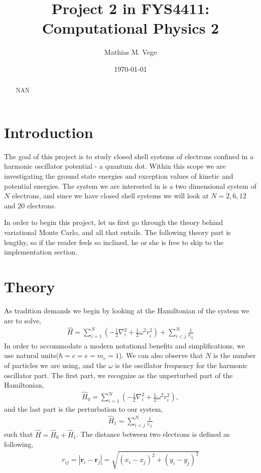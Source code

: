 \documentclass[11pt]{article}
\title{Project 2 in FYS4411: Computational Physics 2}
\author{Mathias M. Vege}
\date{\today}
\begin{document}
\maketitle

\begin{abstract}
NAN
\end{abstract}

\tableofcontents

\section{Introduction}
The goal of this project is to study closed shell systems of electrons confined in a harmonic oscillator potential - a quantum dot. Within this scope we are investigating the ground state energies and exception values of kinetic and potential energies. The system we are interested in is a two dimensional system of $N$ electrons, and since we have closed shell systems we will look at $N=2,6,12$ and $20$ electrons.

In order to begin this project, let us first go through the theory behind variational Monte Carlo, and all that entails. The following theory part is lengthy, so if the reader feels so inclined, he or she is free to skip to the implementation section.

\section{Theory}
As tradition demands we begin by looking at the Hamiltonian of the system we are to solve,
\begin{align}
	\hat{H} = \sum^N_{i=1} \left( -\frac{1}{2}\nabla^2_i + \frac{1}{2}\omega^2r^2_i \right) + \sum^N_{i<j} \frac{1}{r_{ij}}
	\label{eq:hamiltonian}
\end{align}
In order to accommodate a modern notational benefits and simplifications, we use natural units($\hbar = c = e = m_e = 1$). We can also observe that $N$ is the number of particles we are using, and the $\omega$ is the oscillator frequency for the harmonic oscillator part. The first part, we recognize as the unperturbed part of the Hamiltonian,
\begin{align}
	\hat{H}_0 = \sum^N_{i=1} \left( -\frac{1}{2}\nabla^2_i + \frac{1}{2}\omega^2r^2_i \right),
	\label{eq:hamiltonian_unperturbed}
\end{align}
and the last part is the perturbation to our system,
\begin{align}
	\hat{H}_1 = \sum^N_{i<j} \frac{1}{r_{ij}}
	\label{eq:hamiltonian_perturbed}
\end{align}
such that $\hat{H} = \hat{H}_0 + \hat{H}_1$. The distance between two electrons is defined as following,
\begin{align}
	r_{ij} = |\mathbf{r}_i - \mathbf{r}_j| = \sqrt{(x_i - x_j)^2 + (y_i - y_j)^2}
	\label{eq:electron_distance}
\end{align}
\end{document}
